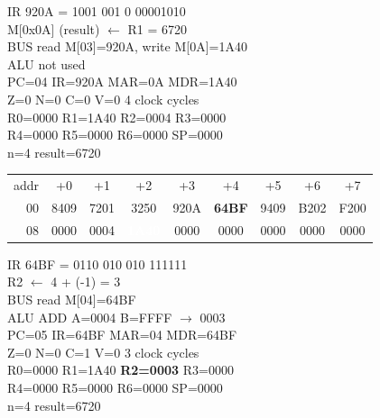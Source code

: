 \noindent\begin{tcolorbox}[stepbox, title={Step 24 \hfill PC 03 \quad ST R1, result}]
\textcolor{dim}{IR} 920A = 1001 001 0 00001010\\
M[0x0A] (result) $\leftarrow$ R1 = 6720\\
\textcolor{dim}{BUS} read M[03]=920A, \textcolor{wrt}{write M[0A]=1A40}\\
\textcolor{dim}{ALU} \textcolor{dim}{not used}\\
PC=04 IR=920A MAR=0A MDR=1A40\\
Z=0 N=0 C=0 V=0 \hfill \textcolor{dim}{4 clock cycles}\\
R0=0000 R1=1A40 R2=0004 R3=0000\\
R4=0000 R5=0000 R6=0000 SP=0000\\
\textcolor{dim}{n=4  result=6720}\\[1pt]
{\setlength{\tabcolsep}{1.6pt}\begin{tabular}{@{}r*{8}{c}@{}}
\textcolor{dim}{addr} & \textcolor{dim}{+0} & \textcolor{dim}{+1} & \textcolor{dim}{+2} & \textcolor{dim}{+3} & \textcolor{dim}{+4} & \textcolor{dim}{+5} & \textcolor{dim}{+6} & \textcolor{dim}{+7}\\
\textcolor{dim}{00} & 8409 & 7201 & 3250 & 920A & \cellcolor{pcc}\textbf{64BF} & 9409 & B202 & F200\\
\textcolor{dim}{08} & 0000 & \cellcolor{datac}0004 & \cellcolor{wrt}\textcolor{white}{\textbf{1A40}} & 0000 & 0000 & 0000 & 0000 & 0000\\
\end{tabular}}
\end{tcolorbox}\hfill\begin{tcolorbox}[stepbox, title={Step 25 \hfill PC 04 \quad ADDI R2, R2, -1}]
\textcolor{dim}{IR} 64BF = 0110 010 010 111111\\
R2 $\leftarrow$ 4 + (-1) = 3\\
\textcolor{dim}{BUS} read M[04]=64BF\\
\textcolor{dim}{ALU} ADD A=0004 B=FFFF $\rightarrow$ 0003\\
PC=05 IR=64BF MAR=04 MDR=64BF\\
Z=0 N=0 C=1 V=0 \hfill \textcolor{dim}{3 clock cycles}\\
R0=0000 R1=1A40 \textcolor{wrt}{\textbf{R2=0003}} R3=0000\\
R4=0000 R5=0000 R6=0000 SP=0000\\
\textcolor{dim}{n=4  result=6720}\\[1pt]
{\setlength{\tabcolsep}{1.6pt}\begin{tabular}{@{}r*{8}{c}@{}}

\end{tabular}}
\end{tcolorbox}
